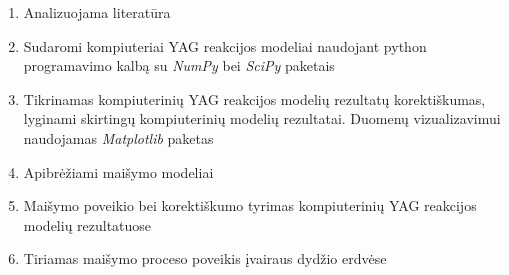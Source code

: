 \documentclass[]{VUMIFTemplateClass}
\begin{document}
\begin{enumerate}
    \item Analizuojama literatūra 
    \item Sudaromi kompiuteriai YAG reakcijos modeliai naudojant python programavimo kalbą su \hbox{\textit{NumPy}} bei \textit{SciPy} paketais
    \item Tikrinamas kompiuterinių YAG reakcijos modelių rezultatų korektiškumas, lyginami skirtingų kompiuterinių modelių rezultatai. Duomenų vizualizavimui naudojamas \textit{Matplotlib} paketas
    \item Apibrėžiami maišymo modeliai
    \item Maišymo poveikio bei korektiškumo tyrimas kompiuterinių YAG reakcijos modelių rezultatuose 
    \item Tiriamas maišymo proceso poveikis įvairaus dydžio erdvėse
\end{enumerate}



\printbibliography[title = {Literatūra ir šaltiniai}]
\end{document}

